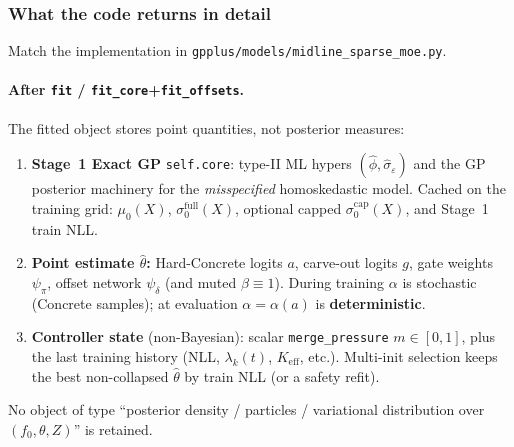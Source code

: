 \documentclass[11pt,a4paper]{article}
\theoremstyle{plain}
\theoremstyle{definition}
\theoremstyle{remark}
\newcommand{\tht}{\theta}
\begin{document}
\subsubsection{What the code returns in detail}
\label{sec:code-returns}
Match the implementation in \texttt{gpplus/models/midline\_sparse\_moe.py}.

\paragraph{After \texttt{fit} / \texttt{fit\_core}+\texttt{fit\_offsets}.}
The fitted object stores point quantities, not posterior measures:
\begin{enumerate}[leftmargin=1.3em,itemsep=0.2em]
  \item \textbf{Stage~1 Exact GP} \texttt{self.core}: type-II ML hypers
        \((\hat\phi,\hat\sigma_\varepsilon)\) and the GP posterior machinery for the
        \emph{misspecified} homoskedastic model. Cached on the training grid:
        \(\mu_0(X)\), \(\sigma_0^{\mathrm{full}}(X)\), optional capped
        \(\sigma_0^{\mathrm{cap}}(X)\), and Stage~1 train NLL.
  \item \textbf{Point estimate \(\hat\tht\):} Hard-Concrete logits \(a\), carve-out
        logits \(g\), gate weights \(\psi_\pi\), offset network \(\psi_\delta\)
        (and muted \(\beta\equiv 1\)). During training \(\alpha\) is stochastic
        (Concrete samples); at evaluation \(\alpha=\alpha(a)\) is
        \textbf{deterministic}.
  \item \textbf{Controller state} (non-Bayesian): scalar
        \texttt{merge\_pressure} \(m\in[0,1]\), plus the last training history
        (NLL, \(\lambda_k(t)\), \(K_{\mathrm{eff}}\), etc.). Multi-init selection
        keeps the best non-collapsed \(\hat\tht\) by train NLL (or a safety refit).
\end{enumerate}
No object of type ``posterior density / particles / variational distribution over
\((f_0,\tht,Z)\)'' is retained.
\end{document}
